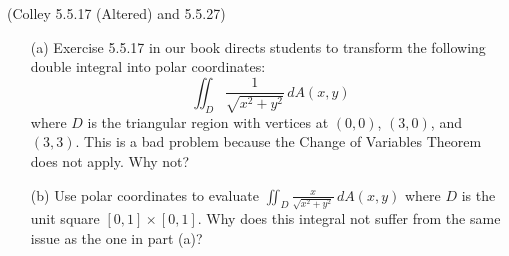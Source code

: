 \documentclass[11pt,letterpaper,cm]{nupset}
\begin{document}
\begin{problem}[Exercise 5] (Colley 5.5.17 (Altered) and 5.5.27)
	\begin{itemize}
		\item[(a)] Exercise 5.5.17 in our book directs students to transform the following double integral into polar coordinates:
		$$\iint_D \frac{1}{\sqrt{x^2+y^2}}\,dA(x,y)$$
		where $D$ is the triangular region with vertices at $(0,0)$, $(3,0)$, and $(3,3)$.  This is a bad problem because the Change of Variables Theorem does not apply. Why not?
		\item[(b)] Use polar coordinates to evaluate $\displaystyle\iint_D \frac x{\sqrt{x^2+y^2}}\,dA(x,y)$ where $D$ is the unit square $[0,1] \times [0,1]$.  Why does this integral not suffer from the same issue as the one in part (a)?
	\end{itemize}
\end{problem}
\end{document}
